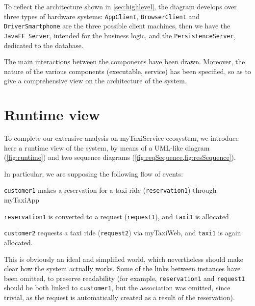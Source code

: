 To reflect the architecture shown in \cref{sec:highlevel}, the diagram develops over three types of hardware systems: \texttt{App\-Cli\-ent}, \texttt{Brows\-er\-Cli\-ent} and \texttt{Driver\-Smart\-phone} are the three possible client machines, then we have the \texttt{Java\-EE Ser\-ver}, intended for the business logic, and the \texttt{Per\-sist\-ence\-Ser\-ver}, dedicated to the database.

The main interactions between the components have been drawn. Moreover, the nature of the various components (executable, service) has been specified, so as to give a comprehensive view on the architecture of the system.












\clearpage%
\section{Runtime view}\label{sec:runtime}
To complete our extensive analysis on myTaxiService ecosystem, we introduce here a runtime view of the system, by means of a \mbox{UML-like} diagram (\cref{fig:runtime}) and two sequence diagrams (\cref{fig:reqSequence,fig:resSequence}).

In particular, we are supposing the following flow of events: \begin{enumerate*}[itemjoin={{; }}, label={{(\arabic*)}}]
	
	\item \texttt{cus\-tom\-er1} makes a reservation for a taxi ride (\texttt{reservation1}) through myTaxiApp
	
	\item \texttt{res\-er\-va\-tion1} is converted to a request (\texttt{re\-quest1}), and \texttt{taxi1} is allocated
	
	\item \texttt{cus\-tom\-er2} requests a taxi ride (\texttt{re\-quest2}) via myTaxiWeb, and \texttt{taxi1} is again allocated\footnotemark.
	
\end{enumerate*}

This is obviously an ideal and simplified world, which nevertheless should make clear how the system actually works. Some of the links between instances have been omitted, to preserve readability (for example, \texttt{res\-er\-va\-tion1} and \texttt{re\-quest1} should be both linked to \texttt{cus\-tom\-er1}, but the association was omitted, since trivial, as the request is automatically created as a result of the reservation).


